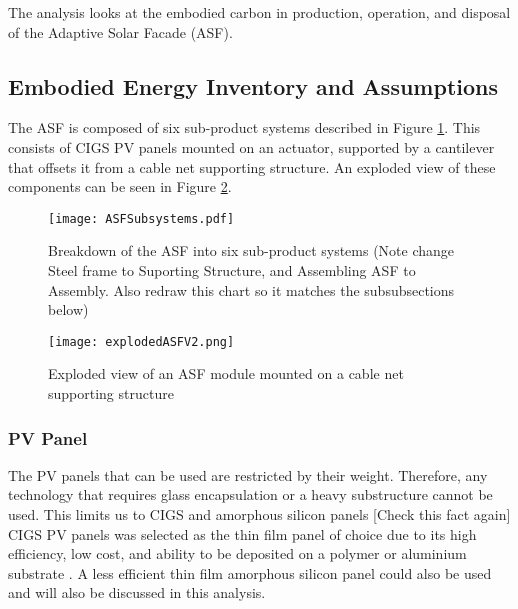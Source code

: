 
The analysis looks at the embodied carbon in production, operation, and disposal of the Adaptive Solar Facade (ASF).

\subsection{Embodied Energy Inventory and Assumptions}

The ASF is composed of six sub-product systems described in Figure \ref{fig:subsystem}. This consists of CIGS PV panels mounted on an actuator, supported by a cantilever that offsets it from a cable net supporting structure. An exploded view of these components can be seen in Figure \ref{fig:explodedView}.

\begin{figure}[H]
\begin{center}
\texttt{[image: ASFSubsystems.pdf]}
\caption{Breakdown of the ASF into six sub-product systems (Note change Steel frame to Suporting Structure, and Assembling ASF to Assembly. Also redraw this chart so it matches the subsubsections below)}
\label{fig:subsystem}
\end{center}
\end{figure}

\begin{figure}[H]
\begin{center}
\texttt{[image: explodedASFV2.png]}
\caption{Exploded view of an ASF module mounted on a cable net supporting structure}
\label{fig:explodedView}
\end{center}
\end{figure}

\subsubsection*{PV Panel}
The PV panels that can be used are restricted by their weight. Therefore, any technology that requires glass encapsulation or a heavy substructure cannot be used. This limits us to CIGS and amorphous silicon panels [Check this fact again]\\

CIGS PV panels was selected as the thin film panel of choice due to its high efficiency, low cost, and ability to be deposited on a polymer or aluminium substrate \cite{chirilua2011highly}. A less efficient thin film amorphous silicon panel could also be used and will also be discussed in this analysis.\\

